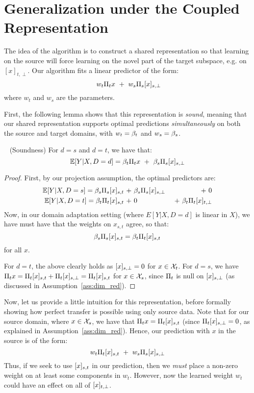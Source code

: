 \section{Generalization under the Coupled Representation}
\label{sec:generalization}

The idea of the algorithm is to construct a shared representation so
that learning on the source will force learning on the novel part of
the target subspace, e.g. on $[x]_{t,\perp}$. Our algorithm fits a
linear predictor of the form:
\begin{equation}~\label{eq:coupled}
w_t \Pi_t x  \ + \  w_s \Pi_s {[x]_{s,\perp}}
\end{equation}
where $w_t$ and $w_s$ are the parameters.  

First, the following lemma shows that this representation is
\emph{sound}, meaning that our shared representation supports optimal
predictions \emph{simultaneously} on both the source and target
domains, with $w_t=\beta_t$ and $w_s=\beta_s$.

\begin{lemma}~\label{lemma:coupled}
(Soundness) For $d =s$ and $d=t$, we have that:
\[
{\mathbb E}[Y|X,D=d] = \beta_t \Pi_t x  \ + \  \beta_s \Pi_s {[x]_{s,\perp}}
\]
\end{lemma}

\begin{proof}
First, by our projection assumption,
the optimal predictors are:
\begin{eqnarray*}
{\mathbb E}[Y|X,D=s] = \beta_s \Pi_s {[x]_{s,t}}  \ + \ & \beta_s \Pi_s {[x]_{s,\perp}}& \ + \ 0 \\
{\mathbb E}[Y|X,D=t] = \beta_t \Pi_t {[x]_{s,t}}  \ + \  & 0 & \ + \  \beta_t \Pi_t {[x]_{t,\perp}}
\end{eqnarray*}
Now, in our domain adaptation setting
(where $E[Y|X,D=d]$ is linear in $X$), we have must have that the
weights on $x_{s,t}$ agree, so that:
\[
\beta_s \Pi_s {[x]_{s,t}} = \beta_t \Pi_t {[x]_{s,t}}
\]
for all $x$.

For $d=t$, the above clearly holds as ${[x]_{s,\perp}}=0$ for $x \in \mathcal{X}_t$. For
$d=s$, we have $\Pi_t x = \Pi_t {[x]_{s,t}} +\Pi_t {[x]_{s,\perp}} = \Pi_t
{[x]_{s,t}}$ for $x \in \mathcal{X}_s$, since $\Pi_t$ is null on ${[x]_{s,\perp}}$ (as
discussed in Assumption~\ref{ass:dim_red}).
\end{proof}

Now, let us provide a little intuition for this representation, before
formally showing how perfect transfer is possible using only
source data. Note that for our source domain, where $x \in \mathcal{X}_s$, we
have that $\Pi_t x = \Pi_t {[x]_{s,t}}$ (since $\Pi_t {[x]_{s,\perp}} =0$, as
explained in Assumption~\ref{ass:dim_red}). Hence, our prediction with
$x$ in the source is of the form:
\[
w_t \Pi_t {[x]_{s,t}}  \ + \  w_s \Pi_s {[x]_{s,\perp}}
\]
Thus, if we seek to use ${[x]_{s,t}}$ in our prediction, then we \emph{must}
place a non-zero weight on at least some components in $w_t$. However,
now the learned weight $w_t$ could have an effect on all of ${[x]_{t,\perp}}$.

